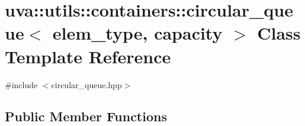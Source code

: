 \hypertarget{classuva_1_1utils_1_1containers_1_1circular__queue}{}\section{uva\+:\+:utils\+:\+:containers\+:\+:circular\+\_\+queue$<$ elem\+\_\+type, capacity $>$ Class Template Reference}
\label{classuva_1_1utils_1_1containers_1_1circular__queue}


{\ttfamily \#include $<$circular\+\_\+queue.\+hpp$>$}

\subsection*{Public Member Functions}
